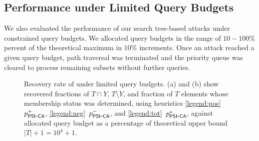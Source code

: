 \subsection{Performance under Limited Query Budgets}

We also evaluated the performance of our search tree-based attacks under constrained query budgets. We allocated query budgets in the range of $10-100\%$ percent of the theoretical maximum in $10\%$ increments. Once an attack reached a given query budget, path traversal was terminated and the priority queue was cleared to process remaining subsets without further queries.

\begin{figure}[t]
    \centering
    \caption{Recovery rate of \PSUCAattack{} under limited query budgets. 
    (a) and (b) show recovered fractions of $T \cap Y$, $T \setminus Y$, and fraction of $T$ elements whose membership status was determined,
    using heuristics \ref{legend:pos}~$p_{\mathsf{PSI\mbox{-}CA}}^{+}$, \ref{legend:neg}~$p_{\mathsf{PSI\mbox{-}CA}}^{-}$, and \ref{legend:tot}~$p_{\mathsf{PSI\mbox{-}CA}}^{*}$,
    against allocated query budget as a percentage of theoretical upper bound $|T| + 1 = 10^4 + 1$.}
    \label{fig:PSUCA_recon_qb_prios}
\end{figure}

